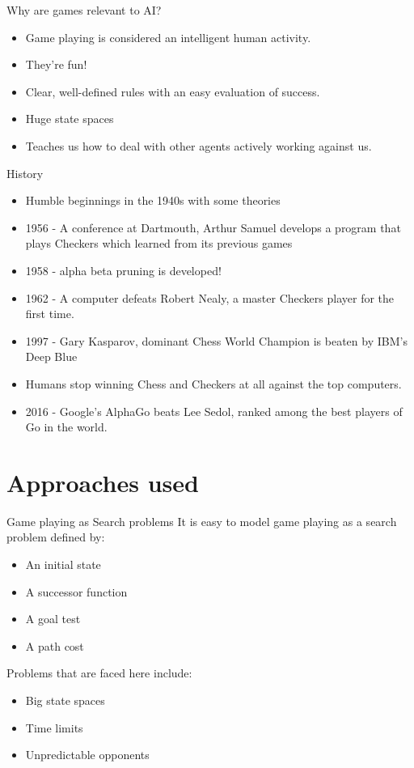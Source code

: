 \documentclass{beamer}
\begin{document}
\begin{frame}{Why are games relevant to AI?}
  \begin{itemize}
    \item Game playing is considered an intelligent human activity.
    \item They're fun!
    \item Clear, well-defined rules with an easy evaluation of success.
    \item Huge state spaces
    \item Teaches us how to deal with other agents actively working against us.
  \end{itemize}
\end{frame}

\begin{frame}{History}
  \begin{itemize}
  \item Humble beginnings in the 1940s with some theories
  \item 1956 - A conference at Dartmouth, Arthur Samuel develops a program that plays Checkers which learned from its previous games
  \item 1958 - alpha beta pruning is developed!
  \item 1962 - A computer defeats Robert Nealy, a master Checkers player for the first time.
  \item 1997 - Gary Kasparov, dominant Chess World Champion is beaten by IBM's Deep Blue
  \item Humans stop winning Chess and Checkers at all against the top computers.
  \item 2016 - Google's AlphaGo beats Lee Sedol, ranked among the best players of Go in the world.
  \end{itemize}
\end{frame}

\section{Approaches used}

\begin{frame}{Game playing as Search problems}
  It is easy to model game playing as a search problem defined by:
  \begin{itemize}
    \item An initial state
    \item A successor function
    \item A goal test
    \item A path cost
  \end{itemize}

  Problems that are faced here include:

  \begin{itemize}
    \item Big state spaces
    \item Time limits
    \item Unpredictable opponents
  \end{itemize}
\end{frame}
\end{document}
